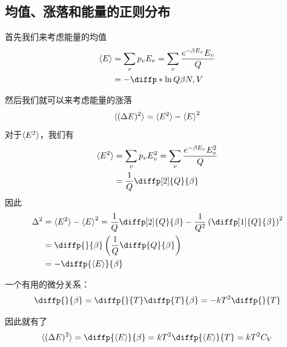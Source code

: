\subsection{均值、涨落和能量的正则分布} %
\label{sub:均值、涨落和能量的正则分布}
首先我们来考虑能量的均值
\begin{equation}
\begin{aligned}
       \braket{E}&=\sum_{v}p_v E_v =\sum_{v}\frac{e^{-\beta E_v}E_v}{Q}\\
       &=-\diffp*{\ln Q}{\beta}{N,V}\label{equ:energy mean in canolical ensemble}
\end{aligned}
\end{equation}

然后我们就可以来考虑能量的涨落
\begin{equation}
       \braket{(\Delta E)^2}=\braket{E^2}-\braket{E}^2
\end{equation}
对于$\braket{E^2}$，我们有\begin{equation}
\begin{aligned}
       \braket{E^2}&=\sum_{v}p_v E_v^2 =\sum_{v}\frac{e^{-\beta E_v}E_v^2}{Q}\\
       &=\frac{1}{Q} \diffp[2]{Q}{\beta}\\
\end{aligned}
\end{equation}
因此\begin{equation}
       \begin{aligned}
              \Delta ^2 &=\braket{E^2}-\braket{E}^2=\frac{1}{Q} \diffp[2]{Q}{\beta}-\frac{1}{Q^2} \left(\diffp[1]{Q}{\beta}\right)^2\\
       &=\diffp{}{\beta} \left(\frac{1}{Q} \diffp{Q}{{\beta}}\right)\\
       &=-\diffp{{\braket{E}}}{\beta}
       \end{aligned}
\end{equation}

\begin{remark}
       一个有用的微分关系：\begin{equation}
              \diffp{}{\beta} =\diffp{}{T} \diffp{T}{\beta}=-kT^2 \diffp{}{T}
       \end{equation}
\end{remark}

因此就有了\begin{equation}
              \braket{(\Delta E)^2} =\diffp{{\braket{E}}}{\beta}=kT^2 \diffp{\braket{E}}{T} =kT^2 C_V
\end{equation}

